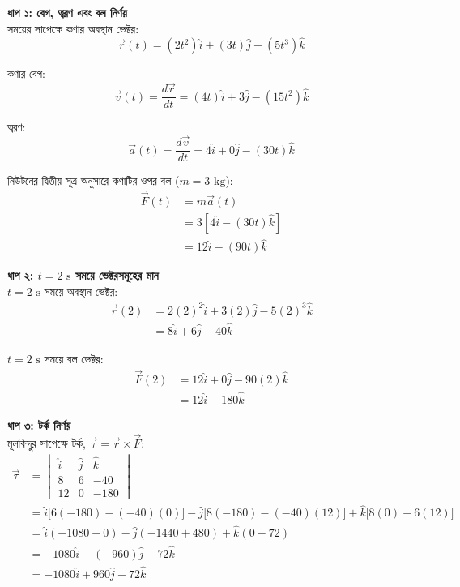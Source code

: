 \documentclass[12pt, a4paper]{article}
\begin{document}
\begin{tcolorbox}[solutionbox={সমাধান (Solution)}]
    \noindent
    \textbf{ধাপ ১: বেগ, ত্বরণ এবং বল নির্ণয়} \\
    সময়ের সাপেক্ষে কণার অবস্থান ভেক্টর:
    \[ \vec{r}(t) = (2t^2)\hat{i} + (3t)\hat{j} - (5t^3)\hat{k} \]
    
    কণার বেগ:
    \[ \vec{v}(t) = \frac{d\vec{r}}{dt} = (4t)\hat{i} + 3\hat{j} - (15t^2)\hat{k} \]
    
    ত্বরণ:
    \[ \vec{a}(t) = \frac{d\vec{v}}{dt} = 4\hat{i} + 0\hat{j} - (30t)\hat{k} \]
    
    নিউটনের দ্বিতীয় সূত্র অনুসারে কণাটির ওপর বল ($m = 3\text{ kg}$):
    \begin{align*}
        \vec{F}(t) &= m\vec{a}(t) \\
        &= 3 \left[ 4\hat{i} - (30t)\hat{k} \right] \\
        &= 12\hat{i} - (90t)\hat{k}
    \end{align*}
    
    \vspace{0.5em}
    \noindent\textbf{ধাপ ২: $t = 2\text{ s}$ সময়ে ভেক্টরসমূহের মান} \\
    $t = 2\text{ s}$ সময়ে অবস্থান ভেক্টর:
    \begin{align*}
        \vec{r}(2) &= 2(2)^2\hat{i} + 3(2)\hat{j} - 5(2)^3\hat{k} \\
        &= 8\hat{i} + 6\hat{j} - 40\hat{k}
    \end{align*}
    
    $t = 2\text{ s}$ সময়ে বল ভেক্টর:
    \begin{align*}
        \vec{F}(2) &= 12\hat{i} + 0\hat{j} - 90(2)\hat{k} \\
        &= 12\hat{i} - 180\hat{k}
    \end{align*}
    
    \vspace{0.5em}
    \noindent\textbf{ধাপ ৩: টর্ক নির্ণয়} \\
    মূলবিন্দুর সাপেক্ষে টর্ক, $\vec{\tau} = \vec{r} \times \vec{F}$:
    \begin{align*}
        \vec{\tau} &= \begin{vmatrix} 
        \hat{i} & \hat{j} & \hat{k} \\ 
        8 & 6 & -40 \\ 
        12 & 0 & -180 
        \end{vmatrix} \\
        &= \hat{i}\big[6(-180) - (-40)(0)\big] - \hat{j}\big[8(-180) - (-40)(12)\big] + \hat{k}\big[8(0) - 6(12)\big] \\
        &= \hat{i}(-1080 - 0) - \hat{j}(-1440 + 480) + \hat{k}(0 - 72) \\
        &= -1080\hat{i} - (-960)\hat{j} - 72\hat{k} \\
        &= -1080\hat{i} + 960\hat{j} - 72\hat{k}
    \end{align*}
    

\end{tcolorbox}
\end{document}
